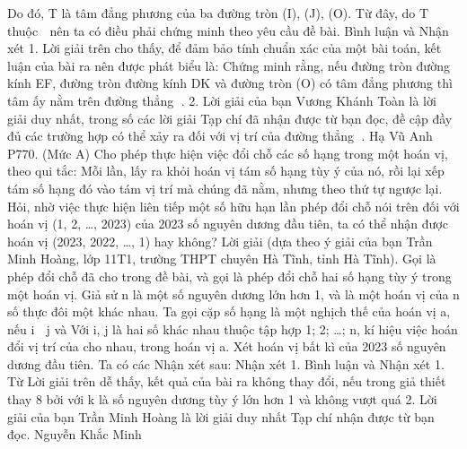 \begin{multicols}{2}
	Do đó, T là tâm đẳng phương của ba đường tròn (I), (J), (O). Từ đây, do T thuộc  nên ta có điều phải chứng minh theo yêu cầu đề bài.
	Bình luận và Nhận xét
	1. Lời giải trên cho thấy, để đảm bảo tính chuẩn xác của một bài toán, kết luận của bài ra nên được phát biểu là: Chứng minh rằng, nếu đường tròn đường kính EF, đường tròn đường kính DK và đường tròn (O) có tâm đẳng phương thì tâm ấy nằm trên đường thẳng .
	2. Lời giải của bạn Vương Khánh Toàn là lời giải duy nhất, trong số các lời giải Tạp chí đã nhận được từ bạn đọc, đề cập đầy đủ các trường hợp có thể xảy ra đối với vị trí của đường thẳng .
	Hạ Vũ Anh
	P770. (Mức A) Cho phép thực hiện việc đổi chỗ các số hạng trong một hoán vị, theo qui tắc: Mỗi lần, lấy ra khỏi hoán vị tám số hạng tùy ý của nó, rồi lại xếp tám số hạng đó vào tám vị trí mà chúng đã nằm, nhưng theo thứ tự ngược lại.
	Hỏi, nhờ việc thực hiện liên tiếp một số hữu hạn lần phép đổi chỗ nói trên đối với hoán vị (1, 2, …, 2023) của 2023 số nguyên dương đầu tiên, ta có thể nhận được hoán vị (2023, 2022, …, 1) hay không?
	Lời giải (dựa theo ý giải của bạn Trần Minh Hoàng, lớp 11T1, trường THPT chuyên Hà Tĩnh, tỉnh Hà Tĩnh).
	Gọi   là phép đổi chỗ đã cho trong đề bài, và gọi   là phép đổi chỗ hai số hạng tùy ý trong một hoán vị.
	Giả sử n là một số nguyên dương lớn hơn 1, và   là một hoán vị của n số thực đôi một khác nhau.
	Ta gọi cặp số hạng   là một nghịch thế của hoán vị a, nếu i  j và  
	Với i, j là hai số khác nhau thuộc tập hợp {1; 2; …; n},   kí hiệu việc hoán đổi vị trí của   cho nhau, trong hoán vị a.
	Xét hoán vị   bất kì của 2023 số nguyên dương đầu tiên.
	Ta có các Nhận xét sau:
	Nhận xét 1. 
	Bình luận và Nhận xét
	1. Từ Lời giải trên dễ thấy, kết quả của bài ra không thay đổi, nếu trong giả thiết thay 8 bởi   với k là số nguyên dương tùy ý lớn hơn 1 và không vượt quá  
	2. Lời giải của bạn Trần Minh Hoàng là lời giải duy nhất Tạp chí nhận được từ bạn đọc.
	Nguyễn Khắc Minh
\end{multicols}

